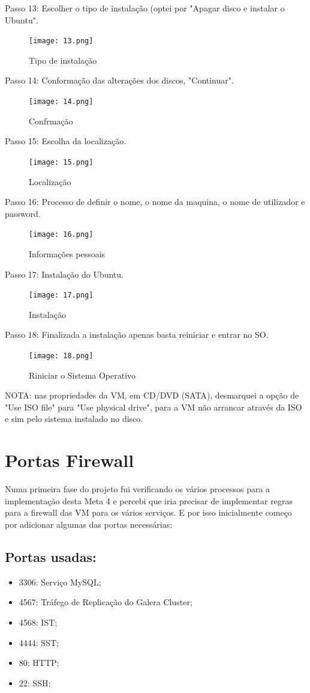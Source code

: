 \newpage
Passo 13: Escolher o tipo de instalação (optei por "Apagar disco e instalar o Ubuntu".
\begin{figure}[H]
\center
\texttt{[image: 13.png]}
\caption{Tipo de instalação}
\end{figure}

Passo 14: Conformação das alterações dos discos, "Continuar".
\begin{figure}[H]
\center
\texttt{[image: 14.png]}
\caption{Confrmação}
\end{figure}

\newpage
Passo 15: Escolha da localização.
\begin{figure}[H]
\center
\texttt{[image: 15.png]}
\caption{Localização}
\end{figure}

Passo 16: Processo de definir o nome, o nome da maquina, o nome de utilizador e password.
\begin{figure}[H]
\center
\texttt{[image: 16.png]}
\caption{Informações pessoais}
\end{figure}

\newpage
Passo 17: Instalação do Ubuntu.
\begin{figure}[H]
\center
\texttt{[image: 17.png]}
\caption{Instalação}
\end{figure}

Passo 18: Finalizada a instalação apenas basta reiniciar e entrar no \ac{SO}.
\begin{figure}[H]
\center
\texttt{[image: 18.png]}
\caption{Riniciar o Sistema Operativo}
\end{figure}

NOTA: nas propriedades da \ac{VM}, em \ac{CD/DVD} (\ac{SATA}), desmarquei a opção de "Use ISO file" para "Use physical drive", para a \ac{VM} não arrancar através da \ac{ISO} e sim pelo sistema instalado no disco.

\newpage
\section{Portas Firewall}
Numa primeira fase do projeto fui verificando os vários processos para a implementação desta Meta 4 e percebi que iria precisar de implementar regras para a firewall das \ac{VM} para os vários serviços. E por isso inicialmente começo por adicionar algumas das portas necessárias:

\subsection{Portas usadas:}
\begin{itemize}
    \item 3306: Serviço MySQL;
    \item 4567: Tráfego de Replicação do Galera Cluster;
    \item 4568: \ac{IST};
    \item 4444: \ac{SST};
    \item 80: \ac{HTTP};
    \item 22: \ac{SSH};    
\end{itemize}

